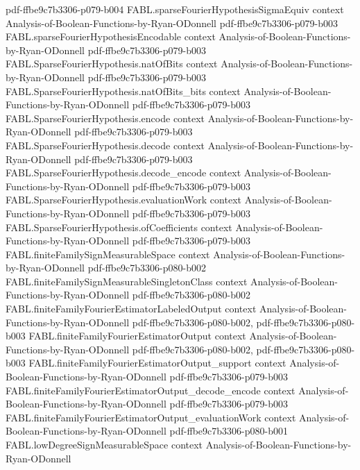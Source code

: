 \begin{theorem}
{    pdf-ffbe9c7b3306-p079-b004}
\proofstep
  {FABL.sparseFourierHypothesisSigmaEquiv}
  {context}
  {Analysis-of-Boolean-Functions-by-Ryan-ODonnell}
  {pdf-ffbe9c7b3306-p079-b003}
\proofstep
  {FABL.sparseFourierHypothesisEncodable}
  {context}
  {Analysis-of-Boolean-Functions-by-Ryan-ODonnell}
  {pdf-ffbe9c7b3306-p079-b003}
\proofstep
  {FABL.SparseFourierHypothesis.natOfBits}
  {context}
  {Analysis-of-Boolean-Functions-by-Ryan-ODonnell}
  {pdf-ffbe9c7b3306-p079-b003}
\proofstep
  {FABL.SparseFourierHypothesis.natOfBits_bits}
  {context}
  {Analysis-of-Boolean-Functions-by-Ryan-ODonnell}
  {pdf-ffbe9c7b3306-p079-b003}
\proofstep
  {FABL.SparseFourierHypothesis.encode}
  {context}
  {Analysis-of-Boolean-Functions-by-Ryan-ODonnell}
  {pdf-ffbe9c7b3306-p079-b003}
\proofstep
  {FABL.SparseFourierHypothesis.decode}
  {context}
  {Analysis-of-Boolean-Functions-by-Ryan-ODonnell}
  {pdf-ffbe9c7b3306-p079-b003}
\proofstep
  {FABL.SparseFourierHypothesis.decode_encode}
  {context}
  {Analysis-of-Boolean-Functions-by-Ryan-ODonnell}
  {pdf-ffbe9c7b3306-p079-b003}
\proofstep
  {FABL.SparseFourierHypothesis.evaluationWork}
  {context}
  {Analysis-of-Boolean-Functions-by-Ryan-ODonnell}
  {pdf-ffbe9c7b3306-p079-b003}
\proofstep
  {FABL.SparseFourierHypothesis.ofCoefficients}
  {context}
  {Analysis-of-Boolean-Functions-by-Ryan-ODonnell}
  {pdf-ffbe9c7b3306-p079-b003}
\proofstep
  {FABL.finiteFamilySignMeasurableSpace}
  {context}
  {Analysis-of-Boolean-Functions-by-Ryan-ODonnell}
  {pdf-ffbe9c7b3306-p080-b002}
\proofstep
  {FABL.finiteFamilySignMeasurableSingletonClass}
  {context}
  {Analysis-of-Boolean-Functions-by-Ryan-ODonnell}
  {pdf-ffbe9c7b3306-p080-b002}
\proofstep
  {FABL.finiteFamilyFourierEstimatorLabeledOutput}
  {context}
  {Analysis-of-Boolean-Functions-by-Ryan-ODonnell}
  {pdf-ffbe9c7b3306-p080-b002,
    pdf-ffbe9c7b3306-p080-b003}
\proofstep
  {FABL.finiteFamilyFourierEstimatorOutput}
  {context}
  {Analysis-of-Boolean-Functions-by-Ryan-ODonnell}
  {pdf-ffbe9c7b3306-p080-b002,
    pdf-ffbe9c7b3306-p080-b003}
\proofstep
  {FABL.finiteFamilyFourierEstimatorOutput_support}
  {context}
  {Analysis-of-Boolean-Functions-by-Ryan-ODonnell}
  {pdf-ffbe9c7b3306-p079-b003}
\proofstep
  {FABL.finiteFamilyFourierEstimatorOutput_decode_encode}
  {context}
  {Analysis-of-Boolean-Functions-by-Ryan-ODonnell}
  {pdf-ffbe9c7b3306-p079-b003}
\proofstep
  {FABL.finiteFamilyFourierEstimatorOutput_evaluationWork}
  {context}
  {Analysis-of-Boolean-Functions-by-Ryan-ODonnell}
  {pdf-ffbe9c7b3306-p080-b001}
\proofstep
  {FABL.lowDegreeSignMeasurableSpace}
  {context}
  {Analysis-of-Boolean-Functions-by-Ryan-ODonnell}

\end{theorem}

